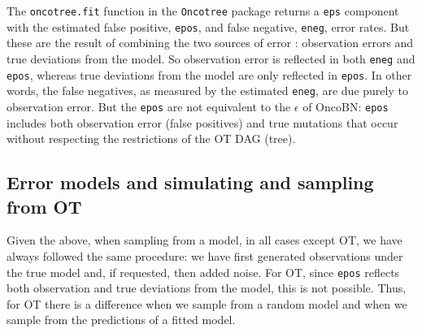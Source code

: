\documentclass[a4paper,11pt]{article}
\begin{document}
\begin{description}
  The \texttt{oncotree.fit} function in the \texttt{Oncotree} package returns a \texttt{eps} component with the estimated false positive, \texttt{epos}, and false negative, \texttt{eneg}, error rates. But these are the result of combining the two sources of error \cite{Szabo2008}: observation errors and true deviations from the model. So observation error is reflected in both \texttt{eneg} and \texttt{epos}, whereas true deviations from the model are only reflected in \texttt{epos}. In other words, the false negatives, as measured by the estimated  \texttt{eneg}, are due purely to observation error. But the \texttt{epos} are not equivalent to the $\epsilon$ of OncoBN: \texttt{epos} includes both observation error (false positives) and true mutations that occur without respecting the restrictions of the OT DAG (tree). 
  
\end{description}


\subsection{Error models and simulating and sampling from OT}
\label{error_ot}
Given the above, when sampling from a model, in all cases except OT, we have always followed the same procedure:  we have first generated observations under the true model and, if requested, then added noise. For OT, since \texttt{epos} reflects both observation and true deviations from the model, this is not possible. Thus, for OT there is a difference when we sample from a random model and when we sample from the predictions of a fitted model.
\end{document}
